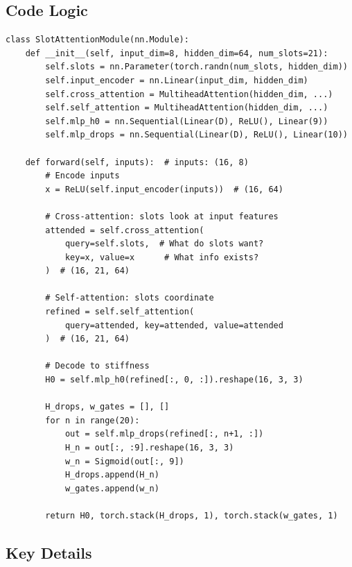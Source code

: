 \documentclass[11pt,a4paper]{article}
\begin{document}
\subsection{Code Logic}

\begin{lstlisting}[caption=Slot-Attention Process]
class SlotAttentionModule(nn.Module):
    def __init__(self, input_dim=8, hidden_dim=64, num_slots=21):
        self.slots = nn.Parameter(torch.randn(num_slots, hidden_dim))
        self.input_encoder = nn.Linear(input_dim, hidden_dim)
        self.cross_attention = MultiheadAttention(hidden_dim, ...)
        self.self_attention = MultiheadAttention(hidden_dim, ...)
        self.mlp_h0 = nn.Sequential(Linear(D), ReLU(), Linear(9))
        self.mlp_drops = nn.Sequential(Linear(D), ReLU(), Linear(10))

    def forward(self, inputs):  # inputs: (16, 8)
        # Encode inputs
        x = ReLU(self.input_encoder(inputs))  # (16, 64)

        # Cross-attention: slots look at input features
        attended = self.cross_attention(
            query=self.slots,  # What do slots want?
            key=x, value=x      # What info exists?
        )  # (16, 21, 64)

        # Self-attention: slots coordinate
        refined = self.self_attention(
            query=attended, key=attended, value=attended
        )  # (16, 21, 64)

        # Decode to stiffness
        H0 = self.mlp_h0(refined[:, 0, :]).reshape(16, 3, 3)

        H_drops, w_gates = [], []
        for n in range(20):
            out = self.mlp_drops(refined[:, n+1, :])
            H_n = out[:, :9].reshape(16, 3, 3)
            w_n = Sigmoid(out[:, 9])
            H_drops.append(H_n)
            w_gates.append(w_n)

        return H0, torch.stack(H_drops, 1), torch.stack(w_gates, 1)
\end{lstlisting}

\subsection{Key Details}
\end{document}
